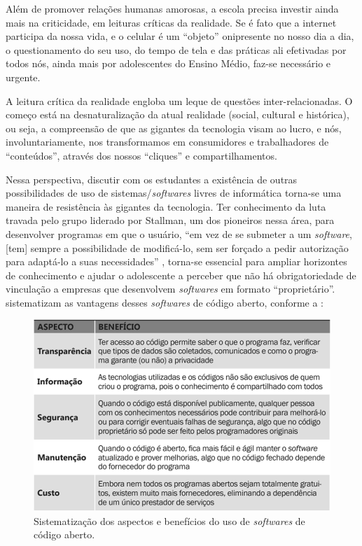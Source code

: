 \documentclass[portuguese]{textolivre}
\begin{document}
Além de promover relações humanas amorosas, a escola precisa investir ainda mais na criticidade, em leituras críticas da realidade. Se é fato que a internet participa da nossa vida, e o celular é um ``objeto'' onipresente no nosso dia a dia, o questionamento do seu uso, do tempo de tela e das práticas ali efetivadas por todos nós, ainda mais por adolescentes do Ensino Médio, faz-se necessário e urgente.

A leitura crítica da realidade engloba um leque de questões inter-relacionadas. O começo está na desnaturalização da atual realidade (social, cultural e histórica), ou seja, a compreensão de que as gigantes da tecnologia visam ao lucro, e nós, involuntariamente, nos transformamos em consumidores e trabalhadores de ``conteúdos'', através dos nossos ``cliques'' e compartilhamentos. 

Nessa perspectiva, discutir com os estudantes a existência de outras possibilidades de uso de sistemas/\textit{softwares} livres de informática torna-se uma maneira de resistência às gigantes da tecnologia. Ter conhecimento da luta travada pelo grupo liderado por Stallman, um dos pioneiros nessa área, para desenvolver programas em que o usuário, ``em vez de se submeter a um \textit{software}, [tem] sempre a possibilidade de modificá-lo, sem ser forçado a pedir autorização para adaptá-lo a suas necessidades'' \cite[p.~131]{loveluck_redes_2018}, torna-se essencial para ampliar horizontes de conhecimento e ajudar o adolescente a perceber que não há obrigatoriedade de vinculação a empresas que desenvolvem \textit{softwares} em formato ``proprietário''. \textcite[p.~6]{gonsales_educacao_2020} sistematizam as vantagens desses \textit{softwares} de código aberto, conforme a :

\begin{figure}
\centering
\begin{minipage}{0.75\linewidth}
\includegraphics[width=\linewidth]{Fig3.png}
\caption{Sistematização dos aspectos e benefícios do uso de \textit{softwares} de código aberto.}
\label{fig5}
\end{minipage}
\end{figure}
\end{document}
